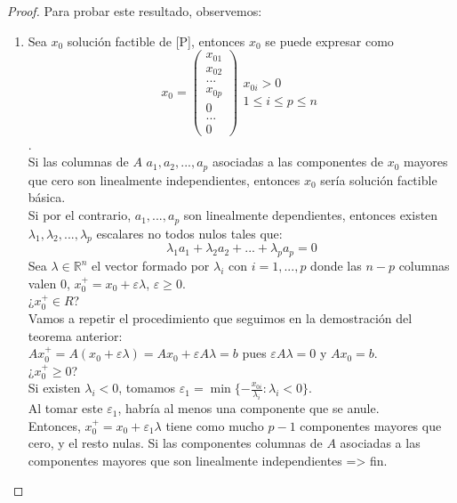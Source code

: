 \documentclass[11pt,fleqn]{book} %
\begin{document}
\begin{proof}
  Para probar este resultado, observemos: 
  \begin{enumerate}
  \item Sea $x_0$ solución factible de [P], entonces $x_0$ se puede expresar como \\
	$$x_0=\left(\begin{array}{c}
	x_{01} \\
	x_{02} \\
	... \\
	x_{0p} \\
	0 \\
	... \\
	0
  \end{array}\right) 
	\begin{array}{c}
	  x_{0i}>0\\
	  1 \leq i \leq p \leq n
	\end{array}
	$$. \\
	Si las columnas de $A$ $a_1, a_2, ..., a_p$ asociadas a las componentes de $x_0$ mayores que cero son linealmente independientes, entonces $x_0$ sería solución factible básica. 	  \\
	Si por el contrario, $a_1, ..., a_p$ son linealmente dependientes, entonces existen $\lambda_1, \lambda_2, ..., \lambda_p$ escalares no todos nulos tales que:
	$$
	\lambda_1 a_1+\lambda_2 a_2+ ... + \lambda_p a_p=0
	$$
	Sea $\lambda \in \mathbb{R}^n$ el vector formado por $\lambda_i$ con $i=1,...,p$ donde las $n-p$ columnas valen $0$, $x_0^+=x_0+\varepsilon\lambda$, $\varepsilon \geq 0$. \\
	¿$x_0^+ \in R$? \\
	Vamos a repetir el procedimiento que seguimos en la demostración del teorema anterior: \\
	$Ax_0^+=A(x_0+\varepsilon \lambda )=Ax_0+\varepsilon A \lambda=b$ pues $\varepsilon A \lambda=0$ y $Ax_0=b$. \\
	¿$x_0^+ \geq 0$? \\
	Si existen $\lambda_i < 0$, tomamos $\varepsilon_1= \min\{-\frac{x_{0i}}{\lambda_i} : \lambda_i < 0\}$. \\
	Al tomar este $\varepsilon_1$, habría al menos una componente que se anule. \\
	Entonces, $x_0^+=x_0+\varepsilon_1 \lambda$ tiene como mucho $p-1$ componentes mayores que cero, y el resto nulas. Si las componentes columnas de $A$ asociadas a las componentes mayores que son linealmente independientes => fin. \\

\end{enumerate}
\end{proof}
\end{document}
